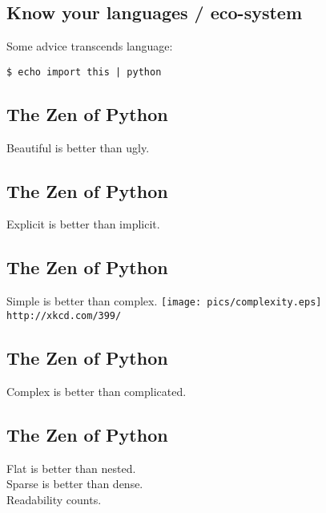\documentclass[xga]{xdvislides}
\begin{document}
\subsection{Know your languages / eco-system}
Some advice transcends language: \\

\begin{verbatim}
$ echo import this | python
\end{verbatim}

\subsection{The Zen of Python}
\Huge
\begin{center}
Beautiful is better than ugly.
\end{center}

\subsection{The Zen of Python}
\begin{center}
Explicit is better than implicit.
\end{center}

\subsection{The Zen of Python}
\begin{center}
    Simple is better than complex.
\vspace*{\fill}
	\texttt{[image: pics/complexity.eps]}
	\\
	\small \verb+http://xkcd.com/399/+
\end{center}
\vspace*{\fill}
\Huge

\subsection{The Zen of Python}
\begin{center}
    Complex is better than complicated.
\end{center}

\subsection{The Zen of Python}
\begin{center}
    Flat is better than nested. \\
    Sparse is better than dense. \\
\vspace{.5in}
    Readability counts.
\end{center}
\end{document}
